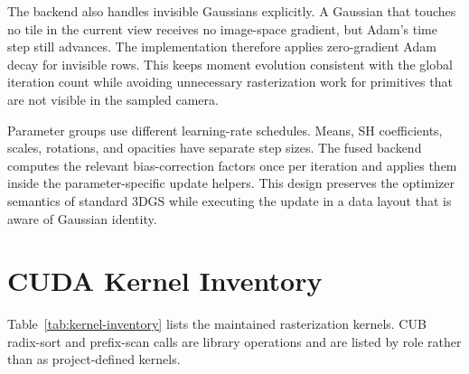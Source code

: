 The backend also handles invisible Gaussians explicitly. A Gaussian that touches no tile in the current view receives no image-space gradient, but Adam's time step still advances. The implementation therefore applies zero-gradient Adam decay for invisible rows. This keeps moment evolution consistent with the global iteration count while avoiding unnecessary rasterization work for primitives that are not visible in the sampled camera.

Parameter groups use different learning-rate schedules. Means, SH coefficients, scales, rotations, and opacities have separate step sizes. The fused backend computes the relevant bias-correction factors once per iteration and applies them inside the parameter-specific update helpers. This design preserves the optimizer semantics of standard 3DGS while executing the update in a data layout that is aware of Gaussian identity.

\section{CUDA Kernel Inventory}

Table~\ref{tab:kernel-inventory} lists the maintained rasterization kernels. CUB radix-sort and prefix-scan calls are library operations and are listed by role rather than as project-defined kernels.

